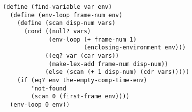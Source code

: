 \documentclass[a4paper,12pt]{article}
\begin{document}
\begin{lstlisting}
(define (find-variable var env)
  (define (env-loop frame-num env)
    (define (scan disp-num vars)
      (cond ((null? vars)
             (env-loop (+ frame-num 1)
                       (enclosing-environment env)))
            ((eq? var (car vars))
             (make-lex-add frame-num disp-num))
            (else (scan (+ 1 disp-num) (cdr vars)))))
    (if (eq? env the-empty-comp-time-env)
        'not-found
        (scan 0 (first-frame env))))
  (env-loop 0 env))
\end{lstlisting}
\end{document}
